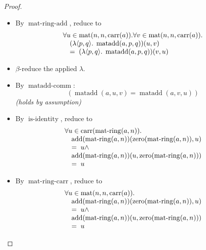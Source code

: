 \documentclass[11pt]{article}
\theoremstyle{plain}
\begin{document}
\begin{proof}
\begin{itemize}[leftmargin=2.8em, itemsep=4pt, parsep=1pt]
  \item[\textbf{56}] By $\operatorname{mat\text{-}ring\text{-}add}$, reduce to
\begin{equation*}
\begin{array}{@{}l@{}} \forall u \in \operatorname{mat}(n, n, \operatorname{carr}(a)). \forall v \in \operatorname{mat}(n, n, \operatorname{carr}(a)). \\ \quad (\lambda \langle p, q \rangle.\; \operatorname{matadd}(a, p, q))(u, v) \\ \quad =\; (\lambda \langle p, q \rangle.\; \operatorname{matadd}(a, p, q))(v, u) \end{array}
\end{equation*}

  \item[\textbf{57}] $\beta$-reduce the applied $\lambda$.
  \item[\textbf{58--60}] By $\operatorname{matadd\text{-}comm}$:
\begin{equation*}
(\operatorname{matadd}(a, u, v) = \operatorname{matadd}(a, v, u))
\end{equation*}
  \emph{(holds by assumption)}
  \item[\textbf{61}] By $\operatorname{is\text{-}identity}$, reduce to
\begin{equation*}
\begin{array}{@{}l@{}} \forall u \in \operatorname{carr}(\operatorname{mat\text{-}ring}(a, n)). \\ \quad \operatorname{add}(\operatorname{mat\text{-}ring}(a, n))(\operatorname{zero}(\operatorname{mat\text{-}ring}(a, n)), u) \\ \quad =\; u \wedge \\ \quad \operatorname{add}(\operatorname{mat\text{-}ring}(a, n))(u, \operatorname{zero}(\operatorname{mat\text{-}ring}(a, n))) \\ \quad =\; u \end{array}
\end{equation*}

  \item[\textbf{62}] By $\operatorname{mat\text{-}ring\text{-}carr}$, reduce to
\begin{equation*}
\begin{array}{@{}l@{}} \forall u \in \operatorname{mat}(n, n, \operatorname{carr}(a)). \\ \quad \operatorname{add}(\operatorname{mat\text{-}ring}(a, n))(\operatorname{zero}(\operatorname{mat\text{-}ring}(a, n)), u) \\ \quad =\; u \wedge \\ \quad \operatorname{add}(\operatorname{mat\text{-}ring}(a, n))(u, \operatorname{zero}(\operatorname{mat\text{-}ring}(a, n))) \\ \quad =\; u \end{array}
\end{equation*}


\end{itemize}
\end{proof}
\end{document}
